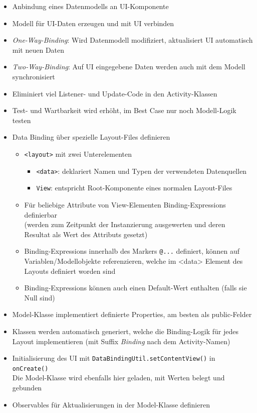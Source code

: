 \documentclass[a4paper]{article}
\begin{document}
		\begin{itemize}
			\item Anbindung eines Datenmodells an UI-Komponente
			\item Modell für UI-Daten erzeugen und mit UI verbinden
			\item \textit{One-Way-Binding}: Wird Datenmodell modifiziert, aktualisiert UI automatisch mit neuen Daten
			\item \textit{Two-Way-Binding}: Auf UI eingegebene Daten werden auch mit dem Modell synchronisiert
			\item Eliminiert viel Listener- und Update-Code in den Activity-Klassen
			\item Test- und Wartbarkeit wird erhöht, im Best Case nur noch Modell-Logik testen
			
			\item Data Binding über spezielle Layout-Files definieren
			\begin{itemize}
				\item \texttt{<layout>} mit zwei Unterelementen
				\begin{itemize}
					\item \texttt{<data>}: deklariert Namen und Typen der verwendeten Datenquellen
					\item \texttt{View}: entspricht Root-Komponente eines normalen Layout-Files
				\end{itemize}
				\item Für beliebige Attribute von View-Elementen Binding-Expressions definierbar\\
					(werden zum Zeitpunkt der Instanzierung ausgewerten und deren Resultat als Wert des Attributs gesetzt)
				\item Binding-Expressions innerhalb des Markers \texttt{@{...}} definiert, können auf Variablen/Modellobjekte referenzieren, welche im <data> Element des Layouts definiert worden sind
				\item Binding-Expressions können auch einen Default-Wert enthalten (falls sie Null sind)
			\end{itemize}
			\item Model-Klasse implementiert definierte Properties, am besten als public-Felder
			\item Klassen werden automatisch generiert, welche die Binding-Logik für jedes Layout implementieren (mit Suffix \textit{Binding} nach dem Activity-Namen)
			\item Initialisierung des UI mit \texttt{DataBindingUtil.setContentView()} in \texttt{onCreate()}\\
				Die Model-Klasse wird ebenfalls hier geladen, mit Werten belegt und gebunden
			\item Observables für Aktualisierungen in der Model-Klasse definieren
		\end{itemize}
	
\end{document}
